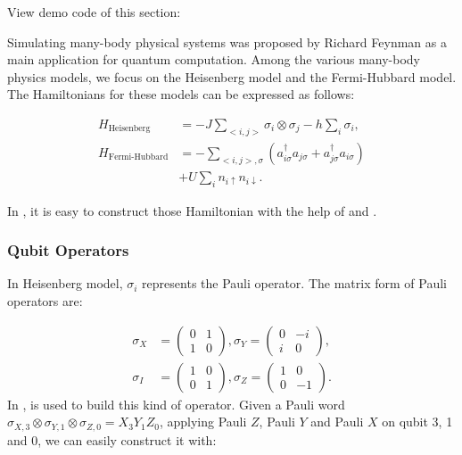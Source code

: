 View demo code of this section: 

Simulating many-body physical systems was proposed by Richard Feynman as a main application for quantum computation. Among the various many-body physics models, we focus on the Heisenberg model and the Fermi-Hubbard model. The Hamiltonians for these models can be expressed as follows:

\begin{align*}
    H_\text{Heisenberg}    & = -J\sum_{<i,j>}\sigma_i\otimes \sigma_j-h\sum_i\sigma_i,                                            \\
    H_\text{Fermi-Hubbard} & = -\sum_{<i,j>,\sigma}\left(a_{i\sigma}^\dagger a_{j\sigma} + a_{j\sigma}^\dagger a_{i\sigma}\right) \\
                           & + U\sum_i n_{i\uparrow}n_{i\downarrow}.
\end{align*}

In \MindQuantum, it is easy to construct those Hamiltonian with the help of \QubitOperator and \FermionOperator.

\subsubsection{Qubit Operators}

In Heisenberg model, $\sigma_i$ represents the Pauli operator. The matrix form of Pauli operators are:

\begin{align*}
    \sigma_X & = \begin{pmatrix}
        0 & 1 \\
        1 & 0
    \end{pmatrix}, \sigma_Y = \begin{pmatrix}
        0 & -i \\
        i & 0
    \end{pmatrix}, \\
    \sigma_I & =\begin{pmatrix}
        1 & 0 \\
        0 & 1
    \end{pmatrix}, \sigma_Z = \begin{pmatrix}
        1 & 0  \\
        0 & -1
    \end{pmatrix}.
\end{align*}
In \MindQuantum, \QubitOperator is used to build this kind of operator. Given a Pauli word $\sigma_{X,3}\otimes \sigma_{Y,1}\otimes \sigma_{Z,0}=X_3 Y_1 Z_0$, applying Pauli $Z$, Pauli $Y$ and Pauli $X$ on qubit 3, 1 and 0,  we can easily construct it with:

